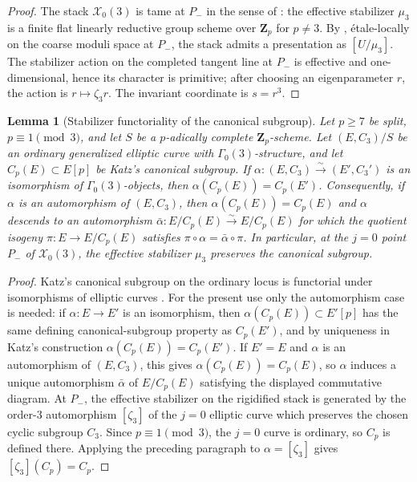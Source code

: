 \documentclass[11pt]{amsart}
\newtheorem{lemma}[theorem]{Lemma}
\theoremstyle{definition}
\theoremstyle{remark}
\newcommand{\Z}{\mathbf{Z}}
\begin{document}
\begin{proof}
The stack $\mathcal X_0(3)$ is tame at $P_-$ in the sense of \cite[Theorem~3.2]{AOV}: the effective stabilizer $\mu_3$ is a finite flat linearly reductive group scheme over $\Z_p$ for $p\ne 3$. By \cite[Theorem~3.2]{AOV}, étale-locally on the coarse moduli space at $P_-$, the stack admits a presentation as $[U/\mu_3]$. The stabilizer action on the completed tangent line at $P_-$ is effective and one-dimensional, hence its character is primitive; after choosing an eigenparameter $r$, the action is $r\mapsto\zeta_3 r$. The invariant coordinate is $s=r^3$.
\end{proof}

\begin{lemma}[Stabilizer functoriality of the canonical subgroup]\label{lem:mu3-preserves-canonical-subgroup}
Let $p\ge 7$ be split, $p\equiv 1\pmod 3$, and let $S$ be a $p$-adically complete $\Z_p$-scheme. Let $(E,C_3)/S$ be an ordinary generalized elliptic curve with $\Gamma_0(3)$-structure, and let $C_p(E)\subset E[p]$ be Katz's canonical subgroup. If $\alpha:(E,C_3)\xrightarrow{\sim}(E',C_3')$ is an isomorphism of $\Gamma_0(3)$-objects, then $\alpha(C_p(E))=C_p(E')$. Consequently, if $\alpha$ is an automorphism of $(E,C_3)$, then $\alpha(C_p(E))=C_p(E)$ and $\alpha$ descends to an automorphism $\bar\alpha:E/C_p(E)\xrightarrow{\sim}E/C_p(E)$ for which the quotient isogeny $\pi:E\to E/C_p(E)$ satisfies $\pi\circ\alpha=\bar\alpha\circ\pi$. In particular, at the $j=0$ point $P_-$ of $\mathcal X_0(3)$, the effective stabilizer $\mu_3$ preserves the canonical subgroup.
\end{lemma}

\begin{proof}
Katz's canonical subgroup on the ordinary locus is functorial under isomorphisms of elliptic curves \cite[\S 3.10]{Katz-padic}. For the present use only the automorphism case is needed: if $\alpha:E\to E'$ is an isomorphism, then $\alpha(C_p(E))\subset E'[p]$ has the same defining canonical-subgroup property as $C_p(E')$, and by uniqueness in Katz's construction $\alpha(C_p(E))=C_p(E')$. If $E'=E$ and $\alpha$ is an automorphism of $(E,C_3)$, this gives $\alpha(C_p(E))=C_p(E)$, so $\alpha$ induces a unique automorphism $\bar\alpha$ of $E/C_p(E)$ satisfying the displayed commutative diagram. At $P_-$, the effective stabilizer on the rigidified stack is generated by the order-$3$ automorphism $[\zeta_3]$ of the $j=0$ elliptic curve which preserves the chosen cyclic subgroup $C_3$. Since $p\equiv 1\pmod 3$, the $j=0$ curve is ordinary, so $C_p$ is defined there. Applying the preceding paragraph to $\alpha=[\zeta_3]$ gives $[\zeta_3](C_p)=C_p$.
\end{proof}
\end{document}
